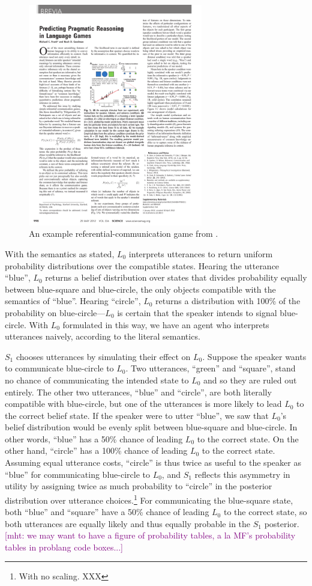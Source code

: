 \documentclass{sp}
\newcommand{\mht}[1]{\textcolor{purple}{[mht: #1]}}
\begin{document}
\begin{figure}[t]
\centering
\includegraphics[width=3in]{rsa-scene.pdf}
\caption{An example referential-communication game from \cite{frankgoodman2012}.}
\label{ref-game}
\end{figure}

With the semantics as stated, $L_0$ interprets utterances to return uniform probability distributions over the compatible states. Hearing the utterance ``blue'', $L_0$ returns a belief distribution over states that divides probability equally between blue-square and blue-circle, the only objects compatible with the semantics of ``blue''. Hearing ``circle'', $L_0$ returns a distribution with 100\% of the probability on blue-circle---$L_0$ is certain that the speaker intends to signal blue-circle. With $L_0$ formulated in this way, we have an agent who interprets utterances naively, according to the literal semantics.

$S_1$ chooses utterances by simulating their effect on $L_0$. Suppose the speaker wants to communicate blue-circle to $L_0$. Two utterances, ``green'' and ``square'', stand no chance of communicating the intended state to $L_0$ and so they are ruled out entirely. The other two utterances, ``blue'' and ``circle'', are both literally compatible with blue-circle, but one of the utterances is more likely to lead $L_0$ to the correct belief state. If the speaker were to utter ``blue'', we saw that $L_0$'s belief distribution would be evenly split between blue-square and blue-circle. In other words, ``blue'' has a 50\% chance of leading $L_0$ to the correct state. On the other hand, ``circle'' has a 100\% chance of leading $L_0$ to the correct state. Assuming equal utterance costs, ``circle'' is thus twice as useful to the speaker as ``blue'' for communicating blue-circle to $L_0$, and $S_1$ reflects this asymmetry in utility by assigning twice as much probability to ``circle'' in the posterior distribution over utterance choices.\footnote{With no scaling. XXX} For communicating the blue-square state, both ``blue'' and ``square'' have a 50\% chance of leading $L_0$ to the correct state, so both utterances are equally likely and thus equally probable in the $S_1$ posterior.
\mht{we may want to have a figure of probability tables, a la MF's probability tables in problang code boxes...}
\end{document}
